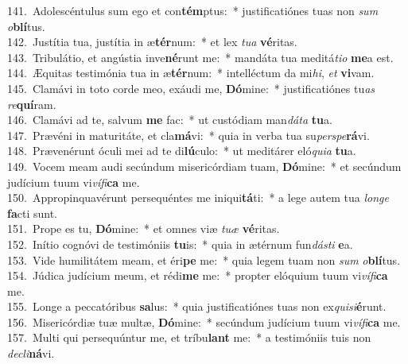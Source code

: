 {141.~}Adolescéntulus sum ego et con\textbf{tém}ptus:~* justificatiónes tuas non \textit{sum} \textit{o}\textbf{blí}tus.\\
{142.~}Justítia tua, justítia in æ\textbf{tér}num:~* et lex \textit{tu}\textit{a} \textbf{vé}ritas.\\
{143.~}Tribulátio, et angústia inve\textbf{né}runt me:~* mandáta tua meditá\textit{ti}\textit{o} \textbf{me}a est.\\
{144.~}Æquitas testimónia tua in æ\textbf{tér}num:~* intelléctum da mi\textit{hi}, \textit{et} \textbf{vi}vam.\\
{145.~}Clamávi in toto corde meo, exáudi me, \textbf{Dó}mine:~* justificatiónes tu\textit{as} \textit{re}\textbf{quí}ram.\\
{146.~}Clamávi ad te, salvum \textbf{me} fac:~* ut custódiam man\textit{dá}\textit{ta} \textbf{tu}a.\\
{147.~}Prævéni in maturitáte, et cla\textbf{má}vi:~* quia in verba tua su\textit{per}\textit{spe}\textbf{rá}vi.\\
{148.~}Prævenérunt óculi mei ad te di\textbf{lú}culo:~* ut meditárer eló\textit{qui}\textit{a} \textbf{tu}a.\\
{149.~}Vocem meam audi secúndum misericórdiam tuam, \textbf{Dó}mine:~* et secúndum judícium tuum vi\textit{ví}\textit{fi}\textbf{ca} me.\\
{150.~}Appropinquavérunt persequéntes me iniqui\textbf{tá}ti:~* a lege autem tua \textit{lon}\textit{ge} \textbf{fa}cti sunt.\\
{151.~}Prope es tu, \textbf{Dó}mine:~* et omnes viæ \textit{tu}\textit{æ} \textbf{vé}ritas.\\
{152.~}Inítio cognóvi de testimóniis \textbf{tu}is:~* quia in ætérnum fun\textit{dá}\textit{sti} \textbf{e}a.\\
{153.~}Vide humilitátem meam, et éri\textbf{pe} me:~* quia legem tuam non \textit{sum} \textit{o}\textbf{blí}tus.\\
{154.~}Júdica judícium meum, et rédi\textbf{me} me:~* propter elóquium tuum vi\textit{ví}\textit{fi}\textbf{ca} me.\\
{155.~}Longe a peccatóribus \textbf{sa}lus:~* quia justificatiónes tuas non ex\textit{qui}\textit{si}\textbf{é}runt.\\
{156.~}Misericórdiæ tuæ multæ, \textbf{Dó}mine:~* secúndum judícium tuum vi\textit{ví}\textit{fi}\textbf{ca} me.\\
{157.~}Multi qui persequúntur me, et tríbu\textbf{lant} me:~* a testimóniis tuis non \textit{de}\textit{cli}\textbf{ná}vi.\\
